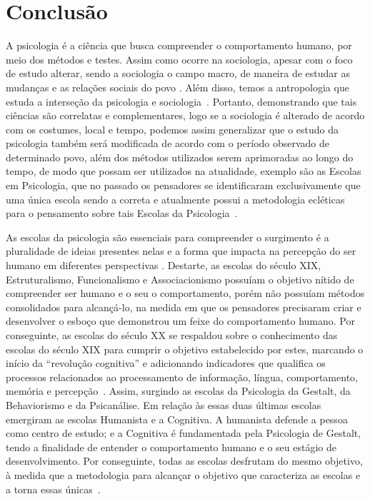 \section{Conclusão}\label{conclusao}

A psicologia é a ciência que busca compreender o comportamento humano, por meio dos métodos e testes.
Assim como ocorre na sociologia, apesar com o foco de estudo alterar, sendo a sociologia o campo macro, de maneira de estudar as mudanças e as relações sociais do povo \cite{quintaneiro2003toque}.
Além disso, temos a antropologia que estuda a interseção da psicologia e sociologia~\cite{castro2016antropologia}.
Portanto, demonstrando que tais ciências são correlatas e complementares, logo se a sociologia é alterado de acordo com os costumes, local e tempo, podemos assim generalizar que o estudo da psicologia também será modificada de acordo com o período observado de determinado povo, além dos métodos utilizados serem aprimoradas ao longo do tempo, de modo que possam ser utilizados na atualidade, exemplo são as Escolas em Psicologia, que no passado os pensadores se identificaram exclusivamente que uma única escola sendo a correta e atualmente possui a metodologia ecléticas para o pensamento sobre tais Escolas da Psicologia~\cite{spink2011psicologia_social}.

As escolas da psicologia são essenciais para compreender o surgimento é a pluralidade de ideias presentes nelas e a forma que impacta na percepção do ser humano em diferentes perspectivas \cite{freitas2008historia}.
Destarte, as escolas do século XIX, Estruturalismo, Funcionalismo e Associacionismo possuíam o objetivo nítido de compreender ser humano e o seu o comportamento, porém não possuíam métodos consolidados para alcançá-lo, na medida em que os pensadores precisaram criar e desenvolver o esboço  que demonstrou um feixe do comportamento humano.
Por conseguinte, as escolas do século XX se respaldou sobre o conhecimento das escolas do século XIX para cumprir o objetivo estabelecido por estes, marcando o início da ``revolução cognitiva'' e adicionando indicadores que qualifica os processos relacionados ao processamento de informação, língua, comportamento, memória e percepção~\cite{eysenck2017psi_cognitiva}.
Assim, surgindo as escolas da Psicologia da Gestalt, da Behaviorismo e da Psicanálise.
Em relação às essas duas últimas escolas emergiram as escolas Humanista e a Cognitiva.
A humanista defende a pessoa como centro de estudo; e a Cognitiva é fundamentada pela Psicologia de Gestalt, tendo a finalidade de entender o comportamento humano e o seu estágio de desenvolvimento.
Por conseguinte, todas as escolas desfrutam do mesmo objetivo, à medida que a metodologia para alcançar o objetivo que caracteriza as escolas e a torna essas únicas~\cite{bock1999psicologias,sternberg2000psicologia}.     

